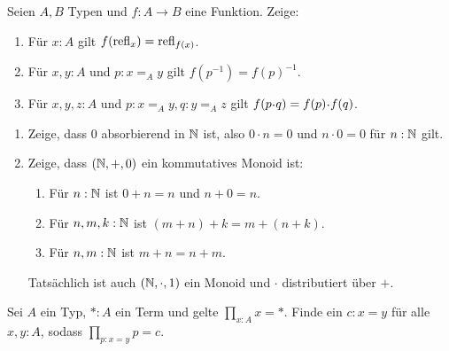 \documentclass{uebung}
\begin{document}

\begin{exercise}
  Seien $A,B$ Typen und $f:A\to B$ eine Funktion.
  Zeige:
  \begin{enumerate}
    \item Für $x:A$ gilt $f(\mathrm{refl}_x)=\mathrm{refl}_{f(x)}$.
    \item Für $x,y:A$ und $p:x=_A y$ gilt $f(p^{-1})=f(p)^{-1}$.
    \item Für $x,y,z:A$ und $p:x=_A y, q:y=_A z$ gilt $f(p\kon q)=f(p)\kon f(q)$.
  \end{enumerate}
\end{exercise}

\begin{exercise}
  \begin{enumerate}
    \item Zeige, dass $0$ absorbierend in $\mathbb{N}$ ist, also $0 \cdot n = 0$ und $n \cdot 0 = 0$ für $n:\mathbb{N}$ gilt.
    \item Zeige, dass $(\mathbb{N},+,0)$ ein kommutatives Monoid ist:
      \begin{enumerate}
        \item Für $n:\mathbb{N}$ ist $0 + n = n$ und $n + 0 = n$.
        \item Für $n,m,k:\mathbb{N}$ ist $(m + n) + k = m + (n + k)$.
        \item Für $n,m:\mathbb{N}$ ist $m + n = n + m$.
      \end{enumerate}
    {\tiny Tatsächlich ist auch $(\mathbb{N},\cdot,1)$ ein Monoid und $\cdot$ distributiert über $+$.}
    \end{enumerate}
\end{exercise}

\begin{exercise}
  Sei $A$ ein Typ, $\ast:A$ ein Term und gelte $\prod_{x:A}x=\ast$.
  Finde ein $c:x=y$ für alle $x,y:A$, sodass $\prod_{p:x=y}p=c$.
\end{exercise}
\end{document}

